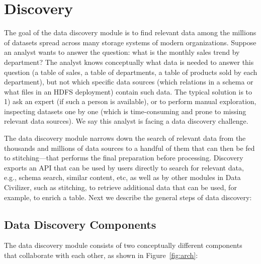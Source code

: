 \section{Discovery}
\label{sec:discovery}

The goal of the data discovery module is to find relevant data among the
millions of datasets spread across many storage systems of modern organizations.
Suppose an analyst wants to answer the question: what is the monthly sales trend
by department? The analyst knows conceptually what data is needed to answer this
question (a table of sales, a table of departments, a table of products sold by
each department), but not which specific data sources (which relations in a
schema or what files in an HDFS deployment) contain such data. The typical
solution is to 1) ask an expert (if such a person is available), or to perform
manual exploration, inspecting datasets one by one (which is time-consuming and
prone to missing relevant data sources). We say this analyst is facing a data
discovery challenge.

The data discovery module narrows down the search of relevant data from the
thousands and millions of data sources to a handful of them that can then be fed
to stitching---that performs the final preparation before processing. Discovery
exports an API that can be used by users directly to search for relevant data,
e.g., schema search, similar content, etc, as well as by other modules in Data
Civilizer, such as stitching, to retrieve additional data that can be used, for
example, to enrich a table. Next we describe the general steps of data
discovery:

\subsection{Data Discovery Components}

The data discovery module consists of two conceptually different components
that collaborate with each other, as shown in Figure~\ref{fig:arch}:

